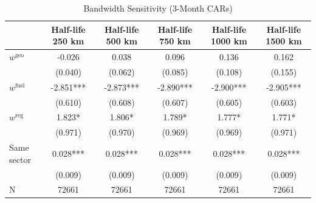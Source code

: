 \begin{table}[!htbp]
\centering
\caption{Bandwidth Sensitivity (3-Month CARs)}
\label{tab:bandwidth_sensitivity}
\begin{tabular}{lccccc}
\toprule
 & Half-life 250 km & Half-life 500 km & Half-life 750 km & Half-life 1000 km & Half-life 1500 km \\
\midrule
$w^{\mathrm{geo}}$ & -0.026 & 0.038 & 0.096 & 0.136 & 0.162 \\
 & (0.040) & (0.062) & (0.085) & (0.108) & (0.155) \\
$w^{\mathrm{fuel}}$ & -2.851*** & -2.873*** & -2.890*** & -2.900*** & -2.905*** \\
 & (0.610) & (0.608) & (0.607) & (0.605) & (0.603) \\
$w^{\mathrm{reg}}$ & 1.823* & 1.806* & 1.789* & 1.777* & 1.771* \\
 & (0.971) & (0.970) & (0.969) & (0.969) & (0.971) \\
Same sector & 0.028*** & 0.028*** & 0.028*** & 0.028*** & 0.028*** \\
 & (0.009) & (0.009) & (0.009) & (0.009) & (0.009) \\
\midrule
N & 72661 & 72661 & 72661 & 72661 & 72661 \\
\bottomrule
\end{tabular}
\end{table}